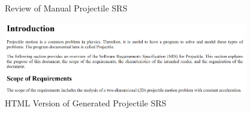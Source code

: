 \documentclass{beamer}
\begin{document}
\begin{frame}
\begin{columns}[T,onlytextwidth]
\begin{column}{.75\textwidth}
\begin{overprint}
\begin{figure}
                    \caption{Review of Manual Projectile SRS \tiny \cite{projectile_wip}}
                \end{figure}
                \begin{figure}
                    \centering\includegraphics[width=0.95\textwidth]{assets/projectile-current.PNG}
                    \caption{HTML Version of Generated Projectile SRS \tiny \cite{projectile_current}}
                \end{figure}
            \end{overprint}
        \end{column}
    \end{columns}


\end{frame}
\end{document}
